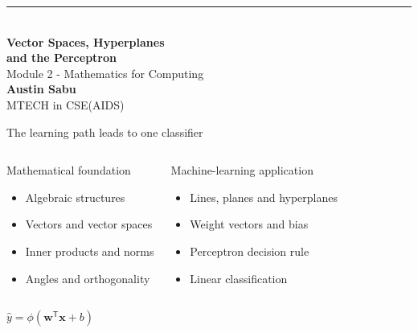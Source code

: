 \documentclass[aspectratio=169,11pt]{beamer}
\title{Vector Spaces, Hyperplanes\and the Perceptron}
\subtitle{Module 2 - Mathematics for Computing}
\author{Austin Sabu}
\date{September 2026}
\newcommand{\keyeq}[1]{%
  \begin{center}
  \setlength{\fboxsep}{9pt}%
  {\color{navy}$\displaystyle #1$}
  \end{center}}
\begin{document}
\begin{frame}[plain]
  \vspace{0.8cm}
  {\color{navy}\rule{2.0cm}{1.5pt}}\\[0.45cm]
  {\fontsize{30}{34}\selectfont\bfseries\color{navy}Vector Spaces, Hyperplanes\\and the Perceptron}\\[0.35cm]
  {\large\color{blue}Module 2 - Mathematics for Computing}\\[0.8cm]
  {\normalsize\bfseries Austin Sabu}\\
  {\small MTECH in CSE(AIDS)}\\
\end{frame}

\begin{frame}{The learning path leads to one classifier}
\begin{columns}[T,onlytextwidth]
\begin{block}{Mathematical foundation}
\begin{itemize}
  \item Algebraic structures
  \item Vectors and vector spaces
  \item Inner products and norms
  \item Angles and orthogonality
\end{itemize}
\end{block}
\begin{exampleblock}{Machine-learning application}
\begin{itemize}
  \item Lines, planes and hyperplanes
  \item Weight vectors and bias
  \item Perceptron decision rule
  \item Linear classification
\end{itemize}
\end{exampleblock}
\end{columns}
\vspace{0.25cm}
\keyeq{\hat y=\phi(\bm w^{\mathsf T}\bm x+b)}
\end{frame}
\end{document}
